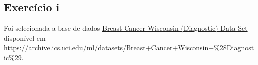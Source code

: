 











\subsection{Exercício i}

Foi selecionada a base de dados  \href{https://archive.ics.uci.edu/ml/datasets/Breast+Cancer+Wisconsin+\%28Diagnostic\%29}{Breast Cancer Wisconsin (Diagnostic) Data Set} \citep{wolberg_uci_1995}
 disponível em \url{https://archive.ics.uci.edu/ml/datasets/Breast+Cancer+Wisconsin+\%28Diagnostic\%29}.

